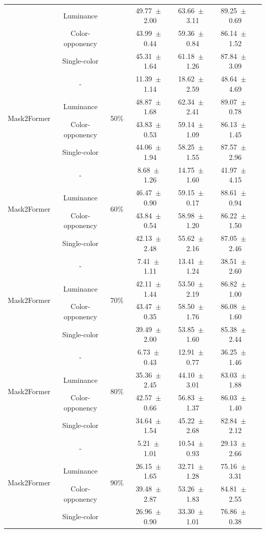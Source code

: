 \begin{table}[h]
\begin{tabular}{@{}lccc ccc@{}}
& Luminance & & 49.77~$\pm$~2.00 & 63.66~$\pm$~3.11 & 89.25~$\pm$~0.69 \\
& Color-opponency & & 43.99~$\pm$~0.44 & 59.36~$\pm$~0.84 & 86.14~$\pm$~1.52 \\
& Single-color & & 45.31~$\pm$~1.64 & 61.18~$\pm$~1.26 & 87.84~$\pm$~3.09 \\
\midrule
\multirow{4}{*}{Mask2Former} & - & \multirow{4}{*}{50\%} & 11.39~$\pm$~1.14 & 18.62~$\pm$~2.59 & 48.64~$\pm$~4.69 \\
& Luminance & & 48.87~$\pm$~1.68 & 62.34~$\pm$~2.41 & 89.07~$\pm$~0.78 \\
& Color-opponency & & 43.83~$\pm$~0.53 & 59.14~$\pm$~1.09 & 86.13~$\pm$~1.45 \\
& Single-color & & 44.06~$\pm$~1.94 & 58.25~$\pm$~1.55 & 87.57~$\pm$~2.96 \\
\midrule
\multirow{4}{*}{Mask2Former} & - & \multirow{4}{*}{60\%} & 8.68~$\pm$~1.26 & 14.75~$\pm$~1.60 & 41.97~$\pm$~4.15 \\
& Luminance & & 46.47~$\pm$~0.90 & 59.15~$\pm$~0.17 & 88.61~$\pm$~0.94 \\
& Color-opponency & & 43.84~$\pm$~0.54 & 58.98~$\pm$~1.20 & 86.22~$\pm$~1.50 \\
& Single-color & & 42.13~$\pm$~2.48 & 55.62~$\pm$~2.16 & 87.05~$\pm$~2.46 \\
\midrule
\multirow{4}{*}{Mask2Former} & - & \multirow{4}{*}{70\%} & 7.41~$\pm$~1.11 & 13.41~$\pm$~1.24 & 38.51~$\pm$~2.60 \\
& Luminance & & 42.11~$\pm$~1.44 & 53.50~$\pm$~2.19 & 86.82~$\pm$~1.00 \\
& Color-opponency & & 43.47~$\pm$~0.35 & 58.50~$\pm$~1.76 & 86.08~$\pm$~1.60 \\
& Single-color & & 39.49~$\pm$~2.00 & 53.85~$\pm$~1.60 & 85.38~$\pm$~2.44 \\
\midrule
\multirow{4}{*}{Mask2Former} & - & \multirow{4}{*}{80\%} & 6.73~$\pm$~0.43 & 12.91~$\pm$~0.77 & 36.25~$\pm$~1.46 \\
& Luminance & & 35.36~$\pm$~2.45 & 44.10~$\pm$~3.01 & 83.03~$\pm$~1.88 \\
& Color-opponency & & 42.57~$\pm$~0.66 & 56.83~$\pm$~1.37 & 86.03~$\pm$~1.40 \\
& Single-color & & 34.64~$\pm$~1.54 & 45.22~$\pm$~2.68 & 82.84~$\pm$~2.12 \\
\midrule
\multirow{4}{*}{Mask2Former} & - & \multirow{4}{*}{90\%} & 5.21~$\pm$~1.01 & 10.54~$\pm$~0.93 & 29.13~$\pm$~2.66 \\
& Luminance & & 26.15~$\pm$~1.65 & 32.71~$\pm$~1.28 & 75.16~$\pm$~3.31 \\
& Color-opponency & & 39.48~$\pm$~2.87 & 53.26~$\pm$~1.83 & 84.81~$\pm$~2.55 \\
& Single-color & & 26.96~$\pm$~0.90 & 33.30~$\pm$~1.01 & 76.86~$\pm$~0.38 \\
\midrule
\bottomrule
\end{tabular}
\label{tab:sparse_results_mask2former_acdc_rain}
\end{table}